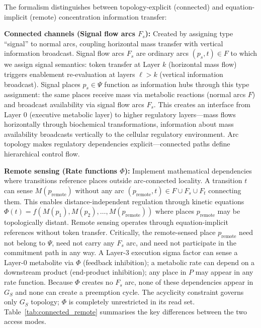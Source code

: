 \documentclass[10pt,letterpaper]{article}
\begin{document}
The formalism distinguishes between topology-explicit (connected) and equation-implicit (remote) concentration information transfer:

\textbf{Connected channels (Signal flow arcs $F_s$):} Created by assigning type ``signal'' to normal arcs, coupling horizontal mass transfer with vertical information broadcast. Signal flow arcs $F_s$ are ordinary arcs $(p_s, t) \in F$ to which we assign signal semantics: token transfer at Layer $k$ (horizontal mass flow) triggers enablement re-evaluation at layers $\ell > k$ (vertical information broadcast). Signal places $p_s \in \Psi$ function as information hubs through this type assignment: the same places receive mass via metabolic reactions (normal arcs $F$) and broadcast availability via signal flow arcs $F_s$. This creates an interface from Layer 0 (executive metabolic layer) to higher regulatory layers---mass flows horizontally through biochemical transformations, information about mass availability broadcasts vertically to the cellular regulatory environment. Arc topology makes regulatory dependencies explicit---connected paths define hierarchical control flow.

\textbf{Remote sensing (Rate functions $\Phi$):} Implement mathematical dependencies where transitions reference places outside arc-connected locality. A transition $t$ can sense $M(p_{\text{remote}})$ without any arc
$(p_{\text{remote}}, t) \in F \cup F_s \cup F_t$
connecting them. This enables distance-independent regulation through kinetic equations
$\Phi(t) = f(M(p_1), M(p_2), \ldots, M(p_{\text{remote}}))$
where places $p_{\text{remote}}$ may be topologically distant. Remote sensing operates through equation-implicit references without token transfer.
Critically, the remote-sensed place $p_{\text{remote}}$ need not belong to $\Psi$, need not carry any $F_s$ arc, and need not participate in the commitment path in any way. A Layer-3 execution sigma factor can sense a Layer-0 metabolite via $\Phi$ (feedback inhibition); a metabolic rate can depend on a downstream product (end-product inhibition); any place in $P$ may appear in any rate function. Because $\Phi$ creates no $F_s$ arc, none of these dependencies appear in $G_S$ and none can create a preemption cycle. The acyclicity constraint governs only $G_S$ topology; $\Phi$ is completely unrestricted in its read set.
Table~\ref{tab:connected_remote} summarises the key differences between the two access modes.
\end{document}
